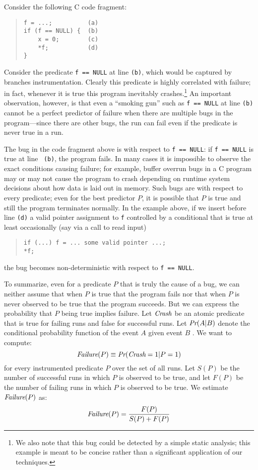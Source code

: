 Consider the following C code fragment:
\begin{quote}
\begin{verbatim}
f = ...;          (a)
if (f == NULL) {  (b)
    x = 0;        (c)
    *f;           (d)
}
\end{verbatim}
\end{quote}
Consider the predicate {\tt f == NULL} at line {\tt (b)}, which would
be captured by branches instrumentation.  Clearly
this predicate is highly correlated with failure; in fact, whenever it
is true this program inevitably crashes.\footnote{We also note that this bug could 
be detected by a simple static analysis; this example is meant to be concise rather than 
a significant application of our techniques.}   An important observation,
however, is that even a ``smoking gun'' such as {\tt f == NULL} at
line {\tt (b)} cannot be a perfect predictor of failure when there are
multiple bugs in the program---since there are other bugs, the run can fail
even if the predicate is never true in a run.

The bug in the code fragment above is  with
respect to {\tt f == NULL}: if {\tt f == NULL} is true at line {\tt
(b)}, the program fails.  In many cases it is impossible to observe
the exact conditions causing failure; for example, buffer overrun bugs
in a C program may or may not cause the program to crash depending on
runtime system decisions about how data is laid out in memory.  Such
bugs are  with respect to every predicate;
even for the best predictor $P$, it is possible
that $P$ is true and still the program terminates normally.  In the
example above, if we insert before line {\tt (d)} a valid pointer
assignment to {\tt f} controlled by a conditional that is true at
least occasionally (say via a call to read input)
\begin{quote}
\begin{verbatim}
if (...) f = ... some valid pointer ...;
*f;
\end{verbatim}
\end{quote}
the bug becomes non-deterministic with respect to {\tt f == NULL}.

To summarize, even for a predicate $P$ that is truly the cause of a bug, we can neither assume that
when $P$ is true that
the program fails nor that when $P$ is never observed to be true  that
the program succeeds.
But we can express the probability that $P$
being true implies failure.  Let $\textit{Crash}$ be an atomic predicate that is
true for failing runs and false for successful runs.  Let $\textit{Pr}(A | B)$ denote
the conditional probability function of the event $A$ given event $B$ .  
We want to compute:
\[ \textit{Failure}(P) \equiv \textit{Pr}(\textit{Crash} = 1 | P = 1) \]
for every instrumented predicate $P$ over the set of all runs.  Let $S(P)$ be the number
of successful runs in which $P$ is observed to be true, and let $F(P)$ be the number of
failing runs in which $P$ is observed to be true.  
We estimate $\textit{Failure}(P)$ as:
\[ \textit{Failure}(P) = \frac{F(P)}{S(P) + F(P)} \]

